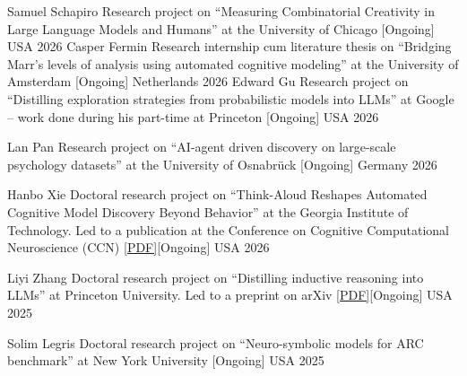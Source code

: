 
\begin{cvhonors}

  \cvhonor
    {Samuel Schapiro} %
    {Research project on ``Measuring Combinatorial Creativity in Large Language Models and Humans'' at the University of Chicago [Ongoing] 
    } %
    {USA}  %
    {2026} %
  \cvhonor
    {Casper Fermin} %
    {Research internship cum literature thesis on ``Bridging Marr's levels of analysis using automated cognitive modeling'' at the University of Amsterdam [Ongoing]} %
    {Netherlands}  %
    {2026} %
  \cvhonor
    {Edward Gu} %
    {Research project on ``Distilling exploration strategies from probabilistic models into LLMs'' at Google -- work done during his part-time at Princeton [Ongoing]} %
    {USA}  %
    {2026} %

  \cvhonor
    {Lan Pan} %
    {Research project on ``AI-agent driven discovery on large-scale psychology datasets'' at the University of Osnabrück [Ongoing] 
    } %
    {Germany}  %
    {2026} %
    
  \cvhonor
    {Hanbo Xie} %
    {Doctoral research project on ``Think-Aloud Reshapes Automated Cognitive Model Discovery Beyond Behavior'' at the Georgia Institute of Technology. %
    Led to a publication at the Conference on Cognitive Computational Neuroscience (CCN) \href{https://arxiv.org/pdf/2605.05091}{[PDF]}[Ongoing]}
    {USA} %
    {2026} %
    
  
  \cvhonor
    {Liyi Zhang} %
    {Doctoral research project on ``Distilling inductive reasoning into LLMs'' at Princeton University. Led to a preprint on arXiv \href{https://arxiv.org/pdf/2606.09856}{[PDF]}[Ongoing]} %
    {USA} %
    {2025} %

    \cvhonor
    {Solim Legris} %
    {Doctoral research project on ``Neuro-symbolic models for ARC benchmark'' at New York University [Ongoing]} %
    {USA} %
    {2025} %


\end{cvhonors}
